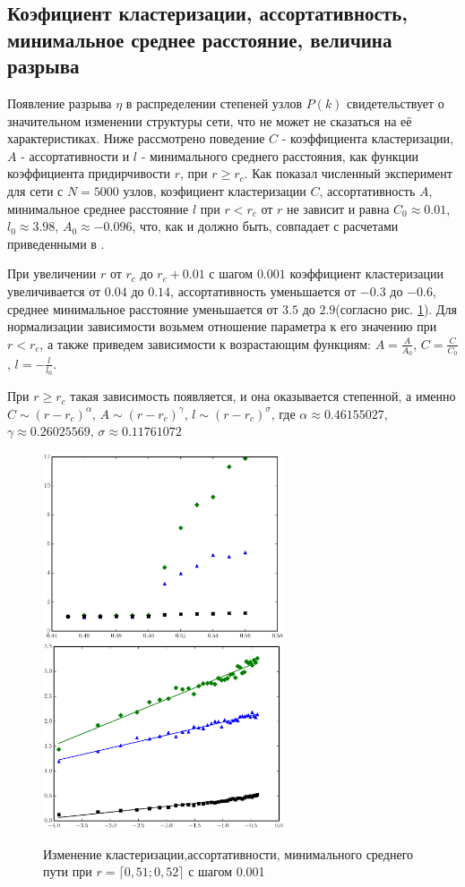 \documentclass[10pt,aps,pra]{revtex4-1}
\begin{document}
\subsection{Коэфициент кластеризации, ассортативность, минимальное среднее расстояние, величина разрыва}
Появление разрыва $\eta$ в распределении степеней узлов $P(k)$ свидетельствует о значительном изменении структуры сети, что не может не сказаться на её характеристиках. Ниже рассмотрено поведение $C$ - коэффициента кластеризации, $A$ - ассортативности и $l$ - минимального среднего расстояния, как функции коэффициента придирчивости $r$, при $r \geq r_c$. Как показал численный эксперимент для сети с $N=5000$ узлов, коэфициент кластеризации $C$, ассортативность $A$, минимальное среднее расстояние $l$ при $r<r_c$ от $r$ не зависит и равна $C_0 \approx 0.01$, $l_0 \approx 3.98$, $A_0 \approx -0.096$, что, как и должно быть, совпадает с расчетами приведенными в \cite{AlBa2,Newman2}. 

При увеличении $r$ от $r_c$ до $r_c + 0.01$ с шагом $0.001$ коэффициент кластеризации увеличивается от $0.04$ до $0.14$, ассортативность уменьшается от $-0.3$ до $-0.6$, среднее минимальное расстояние уменьшается от $3.5$ до $2.9$(согласно рис. \ref{fig:baCharacteristic}). Для нормализации зависимости возьмем отношение параметра к его значению при $r<r_c$, а также приведем зависимости к возрастающим функциям: $A=\frac{A}{A_0}$, $C=\frac{C}{C_0}$, $l=-\frac{l}{l_0}$.

При $r \geq r_c$ такая зависимость появляется, и она оказывается степенной, а именно $C \sim {(r-r_c)}^\alpha$, $A \sim {(r-r_c)}^\gamma$, $l \sim {(r-r_c)}^\sigma$, где $\alpha \approx 0.46155027$, $\gamma \approx 0.26025569$, $\sigma \approx 0.11761072$

\begin{figure}[H]
\label{fig:baCharacteristic}
\centering
\includegraphics[height=5.5cm]{pygraph/baParams.eps}
\includegraphics[height=5.5cm]{pygraph/baParamsLog.eps}
\caption{Изменение кластеризации,ассортативности, минимального среднего пути при $r=\lceil 0,51; 0,52 \rceil$ с шагом 0.001}
\end{figure}
\end{document}
